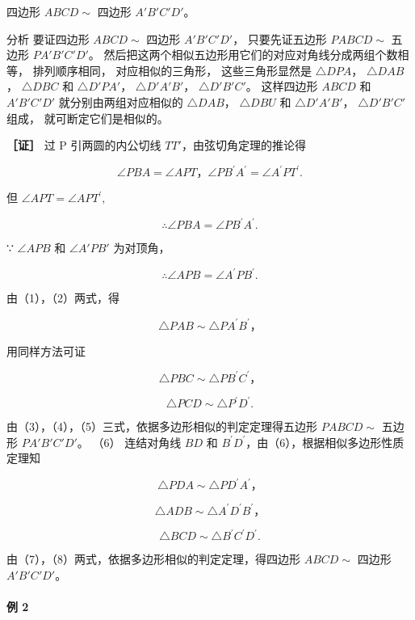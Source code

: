 四边形 \(ABCD \sim\) 四边形 \(A'B'C'D'\)。

分析 要证四边形 \(ABCD \sim\) 四边形 \(A'B'C'D'\)， 只要先证五边形
\(PABCD \sim\) 五边形 \(PA'B'C'D'\)。
然后把这两个相似五边形用它们的对应对角线分成两组个数相等，
排列顺序相同， 对应相似的三角形， 这些三角形显然是 \(\triangle DPA\)，
\(\triangle DAB\)， \(\triangle DBC\) 和 \(\triangle D'PA'\)，
\(\triangle D'A'B'\)， \(\triangle D'B'C'\)。 这样四边形 \(ABCD\) 和
\(A'B'C'D'\) 就分别由两组对应相似的 \(\triangle DAB\)，
\(\triangle DBU\) 和 \(\triangle D'A'B'\)， \(\triangle D'B'C'\) 组成，
就可断定它们是相似的。

\textbf{［证］} 过 P 引两圆的内公切线 \(TT'\)，由弦切角定理的推论得

\[
\angle P B A = \angle A P T\text{，} \angle P B ^ {\prime} A ^ {\prime} = \angle A ^ {\prime} P T ^ {\prime}.
\]

但 \(\angle APT = \angle APT^{\prime},\)

\[
\therefore \angle P B A = \angle P B ^ {\prime} A ^ {\prime}. \tag {1}
\]

∵ \(\angle APB\) 和 \(\angle A'PB'\) 为对顶角，

\[
\therefore \angle A P B = \angle A ^ {\prime} P B ^ {\prime}. \tag {2}
\]

由（1），（2）两式，得

\[
\triangle P A B \sim \triangle P A ^ {\prime} B ^ {\prime}\text{，} \tag {3}
\]

用同样方法可证

\[
\triangle P B C \sim \triangle P B ^ {\prime} C ^ {\prime}\text{，} \tag {4}
\]

\[
\triangle P C D \sim \triangle P ^ {\prime} D ^ {\prime}. \tag {5}
\]

由（3），（4），（5）三式，依据多边形相似的判定定理得五边形
\(PABCD \sim\) 五边形 \(PA'B'C'D'\)。 （6） 连结对角线 \(BD\) 和
\(B^{\prime}D^{\prime}\)，由（6），根据相似多边形性质定理知

\[
\triangle P D A \sim \triangle P D ^ {\prime} A ^ {\prime}\text{，}
\]

\[
\triangle A D B \sim \triangle A ^ {\prime} D ^ {\prime} B ^ {\prime}\text{，} \tag {7}
\]

\[
\triangle B C D \sim \triangle B ^ {\prime} C ^ {\prime} D ^ {\prime}. \tag {8}
\]

由（7），（8）两式，依据多边形相似的判定定理，得四边形 \(ABCD \sim\)
四边形 \(A'B'C'D'\)。

\paragraph{例 2}

